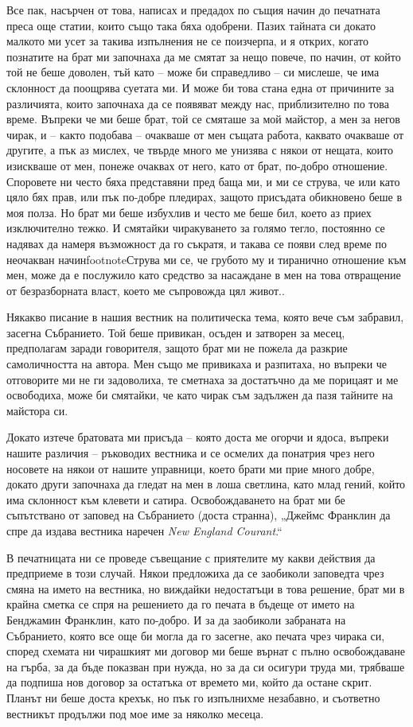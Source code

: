 \documentclass[12pt]{book}
\begin{document}
Все пак, насърчен от това, написах и предадох по същия начин до печатната преса още статии, които също така бяха одобрени. Пазих тайната си докато малкото ми усет за такива изпълнения не се поизчерпа, и я открих, когато познатите на брат ми започнаха да ме смятат за нещо повече, по начин, от който той не беше доволен, тъй като – може би справедливо – си мислеше, че има склонност да поощрява суетата ми. И може би това стана една от причините за различията, които започнаха да се появяват между нас, приблизително по това време.  Въпреки че ми беше брат, той се смяташе за мой майстор, а мен за негов чирак, и – както подобава – очакваше от мен същата работа, каквато очакваше от другите, а пък аз мислех, че твърде много ме унизява с някои от нещата, които изискваше от мен, понеже очаквах от него, като от брат, по-добро отношение. Споровете ни често бяха представяни пред баща ми, и ми се струва, че или като цяло бях прав, или пък по-добре пледирах, защото присъдата обикновено беше в моя полза. Но брат ми беше избухлив и често ме беше бил, което аз приех изключително тежко. И смятайки чиракуването за голямо тегло, постоянно се надявах да намеря възможност да го съкратя, и такава се появи след време по неочакван начинfootnote{Струва ми се, че грубото му и тиранично отношение към мен, може да е послужило като средство за насаждане в мен на това отвращение от безразборната власт, което ме съпровожда цял живот.}.

Някакво писание в нашия вестник на политическа тема, която вече съм забравил, засегна Събранието. Той беше привикан, осъден и затворен за месец, предполагам заради говорителя, защото брат ми не пожела да разкрие самоличността на автора. Мен също ме привикаха и разпитаха, но въпреки че отговорите ми не ги задоволиха, те сметнаха за достатъчно да ме порицаят и ме освободиха, може би смятайки, че като чирак съм задължен да пазя тайните на майстора си.

Докато изтече братовата ми присъда – която доста ме огорчи и ядоса, въпреки нашите различия – ръководих вестника и се осмелих да понатрия чрез него носовете на някои от нашите управници, което брати ми прие много добре, докато други започнаха да гледат на мен в лоша светлина, като млад гений, който има склонност към клевети и сатира. Освобождаването на брат ми бе съпътствано от заповед на Събранието (доста странна), „Джеймс Франклин да спре да издава вестника наречен \textit{New England Courant}.“

В печатницата ни се проведе съвещание с приятелите му какви действия да предприеме в този случай. Някои предложиха да се заобиколи заповедта чрез смяна на името на вестника, но виждайки недостатъци в това решение, брат ми в крайна сметка се спря на решението да го печата в бъдеще от името на Бенджамин Франклин, като по-добро. И за да заобиколи забраната на Събранието, която все още би могла да го засегне, ако печата чрез чирака си, според схемата ни чирашкият ми договор ми беше върнат с пълно освобождаване на гърба, за да бъде показван при нужда, но за да си осигури труда ми, трябваше да подпиша нов договор за остатъка от времето ми, който да остане скрит. Планът ни беше доста крехък, но пък го изпълнихме незабавно, и съответно вестникът продължи под мое име за няколко месеца. 
\end{document}
